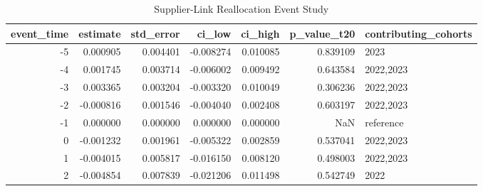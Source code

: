 \begin{table}
\caption{Supplier-Link Reallocation Event Study}
\label{tab:table2_event_study_gate}
\begin{tabular}{rrrrrrl}
\toprule
event_time & estimate & std_error & ci_low & ci_high & p_value_t20 & contributing_cohorts \\
\midrule
-5 & 0.000905 & 0.004401 & -0.008274 & 0.010085 & 0.839109 & 2023 \\
-4 & 0.001745 & 0.003714 & -0.006002 & 0.009492 & 0.643584 & 2022,2023 \\
-3 & 0.003365 & 0.003204 & -0.003320 & 0.010049 & 0.306236 & 2022,2023 \\
-2 & -0.000816 & 0.001546 & -0.004040 & 0.002408 & 0.603197 & 2022,2023 \\
-1 & 0.000000 & 0.000000 & 0.000000 & 0.000000 & NaN & reference \\
0 & -0.001232 & 0.001961 & -0.005322 & 0.002859 & 0.537041 & 2022,2023 \\
1 & -0.004015 & 0.005817 & -0.016150 & 0.008120 & 0.498003 & 2022,2023 \\
2 & -0.004854 & 0.007839 & -0.021206 & 0.011498 & 0.542749 & 2022 \\
\bottomrule
\end{tabular}
\end{table}

